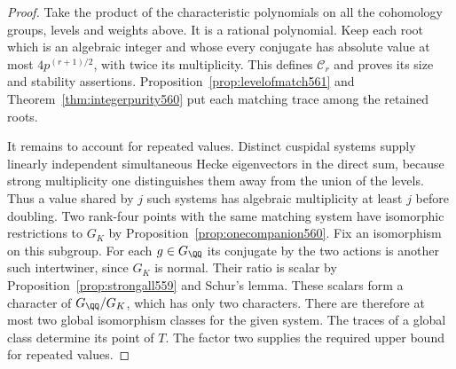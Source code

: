 \documentclass[a4paper,11pt]{article}
\theoremstyle{definition}
\theoremstyle{remark}
\numberwithin{equation}{section}
\begin{document}
\begin{proof}
Take the product of the characteristic polynomials on all
the cohomology groups, levels and weights above. It is a
rational polynomial. Keep each root which is an algebraic
integer and whose every conjugate has absolute value at most
\(4p^{(r+1)/2}\), with twice its multiplicity. This defines
\(\mathcal C_r\) and proves its size and stability assertions.
Proposition~\ref{prop:levelofmatch561} and
Theorem~\ref{thm:integerpurity560} put each matching trace
among the retained roots.

It remains to account for repeated values. Distinct cuspidal
systems supply linearly independent simultaneous Hecke
eigenvectors in the direct sum, because strong multiplicity one
distinguishes them away from the union of the levels. Thus a
value shared by \(j\) such systems has algebraic multiplicity
at least \(j\) before doubling. Two rank-four points with the
same matching system have isomorphic restrictions to \(G_K\)
by Proposition~\ref{prop:onecompanion560}. Fix an isomorphism
on this subgroup. For each \(g\in G_\QQ\) its conjugate by
the two actions is another such intertwiner, since \(G_K\) is
normal. Their ratio is scalar by
Proposition~\ref{prop:strongall559} and Schur's lemma. These
scalars form a character of \(G_\QQ/G_K\), which has only two
characters. There are therefore at most two global isomorphism
classes for the given system. The traces of a global class
determine its point of \(T\). The factor two supplies the
required upper bound for repeated values.
\end{proof}
\end{document}
